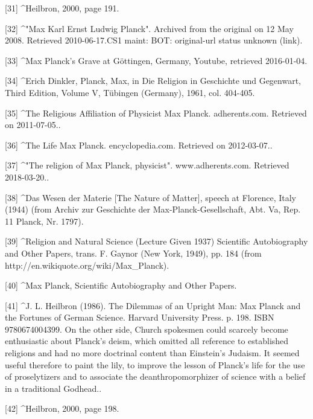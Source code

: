 [31]
^Heilbron, 2000, page 191.

[32]
^"Max Karl Ernst Ludwig Planck". Archived from the original on 12 May 2008. Retrieved 2010-06-17.CS1 maint: BOT: original-url status unknown (link).

[33]
^Max Planck's Grave at Göttingen, Germany, Youtube, retrieved 2016-01-04.

[34]
^Erich Dinkler, Planck, Max, in Die Religion in Geschichte und Gegenwart, Third Edition, Volume V, Tübingen (Germany), 1961, col. 404-405.

[35]
^The Religious Affiliation of Physicist Max Planck. adherents.com. Retrieved on 2011-07-05..

[36]
^The Life Max Planck. encyclopedia.com. Retrieved on 2012-03-07..

[37]
^"The religion of Max Planck, physicist". www.adherents.com. Retrieved 2018-03-20..

[38]
^Das Wesen der Materie [The Nature of Matter], speech at Florence, Italy (1944) (from Archiv zur Geschichte der Max-Planck-Gesellschaft, Abt. Va, Rep. 11 Planck, Nr. 1797).

[39]
^Religion and Natural Science (Lecture Given 1937) Scientific Autobiography and Other Papers, trans. F. Gaynor (New York, 1949), pp. 184 (from http://en.wikiquote.org/wiki/Max_Planck).

[40]
^Max Planck, Scientific Autobiography and Other Papers.

[41]
^J. L. Heilbron (1986). The Dilemmas of an Upright Man: Max Planck and the Fortunes of German Science. Harvard University Press. p. 198. ISBN 9780674004399. On the other side, Church spokesmen could scarcely become enthusiastic about Planck's deism, which omitted all reference to established religions and had no more doctrinal content than Einstein's Judaism. It seemed useful therefore to paint the lily, to improve the lesson of Planck's life for the use of proselytizers and to associate the deanthropomorphizer of science with a belief in a traditional Godhead..

[42]
^Heilbron, 2000, page 198.